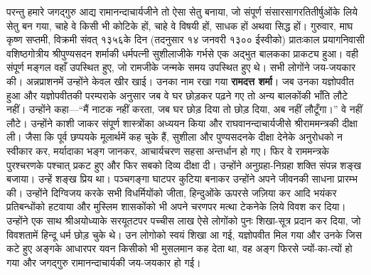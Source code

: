 \begin{sloppypar}\justifying{}
परन्तु हमारे जगद्गुरु आद्य रामानन्दाचार्यजीने तो ऐसा सेतु बनाया, जो संपूर्ण संसार\-सागर\-तितीर्षुओंके लिये सेतु बन गया, चाहे वे किसी भी कोटिके हों, चाहे वे विषयी हों, साधक हों अथवा सिद्ध हों। गुरुवार, माघ कृष्ण सप्तमी, विक्रमी संवत् १३५६के दिन (तदनुसार १४ जनवरी १३०० ईस्वीको) प्रातःकाल प्रयाग\-निवासी वशिष्ठगोत्रीय श्रीपुण्यसदन शर्माकी धर्मपत्नी सुशीलाजीके गर्भसे एक अद्भुत बालकका प्राकट्य हुआ। वही संपूर्ण मङ्गल वहाँ उपस्थित हुए, जो रामजीके जन्मके समय उपस्थित हुए थे। सभी लोगोंने जय-जयकार की। अन्नप्राशनमें उन्होंने केवल खीर खाई। उनका नाम रखा गया \textbf{रामदत्त शर्मा}। जब उनका यज्ञोपवीत हुआ और यज्ञोपवीतकी परम्पराके अनुसार जब वे घर छोड़कर पढ़ने गए तो अन्य बालकोंकी भाँति लौटे नहीं। उन्होंने कहा—“मैं नाटक नहीं करता, जब घर छोड़ दिया तो छोड़ दिया, अब नहीं लौटूँगा।” वे नहीं लौटे। उन्होंने काशी जाकर संपूर्ण शास्त्रोंका अध्ययन किया और राघवानन्दाचार्यजीसे श्रीराममन्त्रकी दीक्षा ली। जैसा कि पूर्व छप्पयके मूलार्थमें कह चुके हैं, सुशीला और पुण्यसदनके दीक्षा देनेके अनुरोधको न स्वीकार कर, मर्यादाका भङ्ग जानकर, आचार्यचरण सहसा अन्तर्धान हो गए। फिर वे राममन्त्रके पुरश्चरणके पश्चात् प्रकट हुए और फिर सबको दिव्य दीक्षा दी। उन्होंने अनुग्रहा-निग्रहा शक्ति संपन्न शङ्ख बजाया। उन्हें शङ्ख प्रिय था। पञ्चगङ्गा घाटपर कुटिया बनाकर उन्होंने अपने जीवनकी साधना प्रारम्भ की। उन्होंने दिग्विजय करके सभी विधर्मियोंको जीता, हिन्दुओंके ऊपरसे जज़िया कर आदि भयंकर प्रतिबन्धोंको हटवाया और मुस्लिम शासकोंको भी अपने चरणपर मत्था टेकनेके लिये विवश कर दिया। उन्होंने एक साथ श्रीअयोध्याके सरयूतटपर पच्चीस लाख ऐसे लोगोंको पुनः शिखा-सूत्र प्रदान कर दिया, जो विवशतामें हिन्दू धर्म छोड़ चुके थे। उन लोगोको स्वयं शिखा आ गई, यज्ञोपवीत मिल गया और उनके जिस कटे हुए अङ्गके आधारपर यवन किसीको भी मुसलमान कह देता था, वह अङ्ग फिरसे ज्यों-का-त्यों हो गया और जगद्गुरु रामानन्दाचार्यकी जय-जयकार हो गई।
\end{sloppypar}
